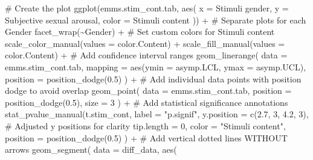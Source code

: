 \documentclass[
  bookmarksnumbered]{article}
\newenvironment{Shaded}{\begin{snugshade}}{\end{snugshade}}
\newcommand{\AttributeTok}[1]{\textcolor[rgb]{0.80,0.80,0.80}{#1}}
\newcommand{\CommentTok}[1]{\textcolor[rgb]{0.50,0.62,0.50}{#1}}
\newcommand{\DecValTok}[1]{\textcolor[rgb]{0.86,0.86,0.80}{#1}}
\newcommand{\FloatTok}[1]{\textcolor[rgb]{0.75,0.75,0.82}{#1}}
\newcommand{\FunctionTok}[1]{\textcolor[rgb]{0.94,0.94,0.56}{#1}}
\newcommand{\NormalTok}[1]{\textcolor[rgb]{0.80,0.80,0.80}{#1}}
\newcommand{\SpecialCharTok}[1]{\textcolor[rgb]{0.86,0.64,0.64}{#1}}
\newcommand{\StringTok}[1]{\textcolor[rgb]{0.80,0.58,0.58}{#1}}
\begin{document}
\begin{Shaded}
\begin{Highlighting}[]
\CommentTok{\# Create the plot}
\FunctionTok{ggplot}\NormalTok{(emms.stim\_cont.tab, }\FunctionTok{aes}\NormalTok{(}
  \AttributeTok{x =} \StringTok{\textasciigrave{}}\AttributeTok{Stimuli gender}\StringTok{\textasciigrave{}}\NormalTok{, }\AttributeTok{y =} \StringTok{\textasciigrave{}}\AttributeTok{Subjective sexual arousal}\StringTok{\textasciigrave{}}\NormalTok{,}
  \AttributeTok{color =} \StringTok{\textasciigrave{}}\AttributeTok{Stimuli content}\StringTok{\textasciigrave{}}
\NormalTok{)) }\SpecialCharTok{+}
  \CommentTok{\# Separate plots for each Gender}
  \FunctionTok{facet\_wrap}\NormalTok{(}\SpecialCharTok{\textasciitilde{}}\NormalTok{Gender) }\SpecialCharTok{+}
  \CommentTok{\# Set custom colors for Stimuli content}
  \FunctionTok{scale\_color\_manual}\NormalTok{(}\AttributeTok{values =}\NormalTok{ color.Content) }\SpecialCharTok{+}
  \FunctionTok{scale\_fill\_manual}\NormalTok{(}\AttributeTok{values =}\NormalTok{ color.Content) }\SpecialCharTok{+}
  \CommentTok{\# Add confidence interval ranges}
  \FunctionTok{geom\_linerange}\NormalTok{(}
    \AttributeTok{data =}\NormalTok{ emms.stim\_cont.tab,}
    \AttributeTok{mapping =} \FunctionTok{aes}\NormalTok{(}\AttributeTok{ymin =}\NormalTok{ asymp.LCL, }\AttributeTok{ymax =}\NormalTok{ asymp.UCL),}
    \AttributeTok{position =} \FunctionTok{position\_dodge}\NormalTok{(}\FloatTok{0.5}\NormalTok{)}
\NormalTok{  ) }\SpecialCharTok{+}
  \CommentTok{\# Add individual data points with position dodge to avoid overlap}
  \FunctionTok{geom\_point}\NormalTok{(}
    \AttributeTok{data =}\NormalTok{ emms.stim\_cont.tab,}
    \AttributeTok{position =} \FunctionTok{position\_dodge}\NormalTok{(}\FloatTok{0.5}\NormalTok{),}
    \AttributeTok{size =} \DecValTok{3}
\NormalTok{  ) }\SpecialCharTok{+}
  \CommentTok{\# Add statistical significance annotations}
  \FunctionTok{stat\_pvalue\_manual}\NormalTok{(t.stim\_cont,}
    \AttributeTok{label =} \StringTok{"p.signif"}\NormalTok{,}
    \AttributeTok{y.position =} \FunctionTok{c}\NormalTok{(}\FloatTok{2.7}\NormalTok{, }\DecValTok{3}\NormalTok{, }\FloatTok{4.2}\NormalTok{, }\DecValTok{3}\NormalTok{), }\CommentTok{\# Adjusted y positions for clarity}
    \AttributeTok{tip.length =} \DecValTok{0}\NormalTok{,}
    \AttributeTok{color =} \StringTok{"Stimuli content"}\NormalTok{,}
    \AttributeTok{position =} \FunctionTok{position\_dodge}\NormalTok{(}\FloatTok{0.5}\NormalTok{)}
\NormalTok{  ) }\SpecialCharTok{+}
  \CommentTok{\# Add vertical dotted lines WITHOUT arrows}
  \FunctionTok{geom\_segment}\NormalTok{(}
    \AttributeTok{data =}\NormalTok{ diff\_data,}
    \FunctionTok{aes}\NormalTok{(}

\end{Highlighting}
\end{Shaded}
\end{document}
